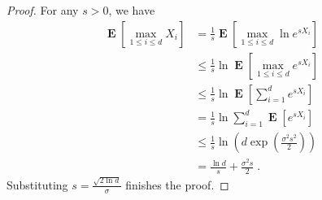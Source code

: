 \documentclass{article}
\DeclareMathOperator*{\Exp}{\mathbf{E}}
\begin{document}
\begin{proof}
For any $s > 0$, we have
\begin{align*}
\Exp \left[ \max_{1 \le i \le d} X_i \right]
& = \frac{1}{s} \Exp \left[ \max_{1 \le i \le d} \ln e^{s X_i} \right] \\
& \le \frac{1}{s} \ln \Exp \left[ \max_{1 \le i \le d} e^{s X_i} \right] \\
& \le \frac{1}{s} \ln \Exp \left[ \sum_{i=1}^d e^{s X_i} \right] \\
& = \frac{1}{s} \ln \sum_{i=1}^d \Exp \left[ e^{s X_i} \right] \\
& \le \frac{1}{s} \ln \left( d  \exp\left( \frac{\sigma^2 s^2}{2} \right) \right) \\
& = \frac{\ln d}{s} +  \frac{\sigma^2 s}{2} \; .
\end{align*}
Substituting $s=\frac{\sqrt{2 \ln d}}{\sigma}$ finishes the proof.
\end{proof}
\end{document}
